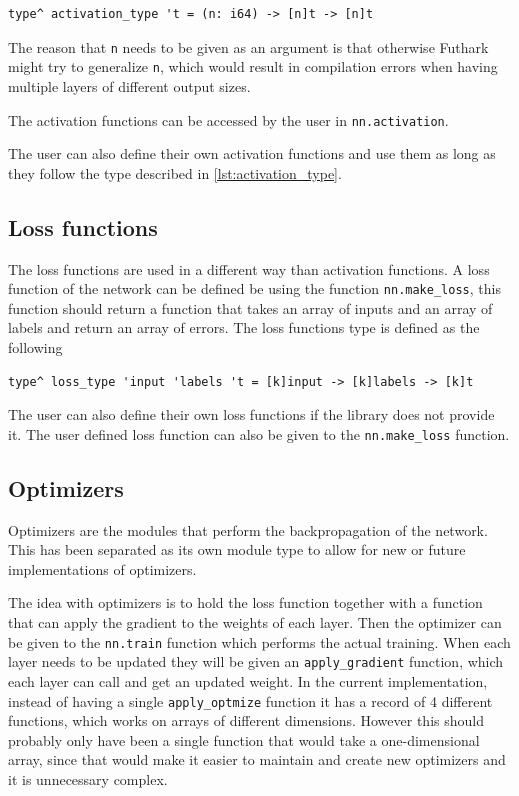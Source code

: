 \begin{lstlisting}[caption=The type definition of activation functions., label={lst:activation_type}]
type^ activation_type 't = (n: i64) -> [n]t -> [n]t
\end{lstlisting}

The reason that \texttt{n} needs to be given as an argument is that otherwise Futhark might try to generalize \texttt{n}, which would result in compilation errors when having multiple layers of different output sizes.

The activation functions can be accessed by the user in \texttt{nn.activation}.

The user can also define their own activation functions and use them as long as they follow the type described in \autoref{lst:activation_type}.

\subsection{Loss functions}

The loss functions are used in a different way than activation functions. A loss function of the network can be defined be using the function \texttt{nn.make\_loss}, this function should return a function that takes an array of inputs and an array of labels and return an array of errors. The loss functions type is defined as the following

\begin{lstlisting}
type^ loss_type 'input 'labels 't = [k]input -> [k]labels -> [k]t
\end{lstlisting}

The user can also define their own loss functions if the library does not provide it. The user defined loss function can also be given to the \texttt{nn.make\_loss} function.

\subsection{Optimizers}

Optimizers are the modules that perform the backpropagation of the network.
This has been separated as its own module type to allow for new or future implementations of optimizers.

The idea with optimizers is to hold the loss function together with a function that can apply the gradient to the weights of each layer.
Then the optimizer can be given to the \texttt{nn.train} function which performs the actual training. When each layer needs to be updated they will be given an \texttt{apply\_gradient} function, which each layer can call and get an updated weight.
In the current implementation, instead of having a single \texttt{apply\_optmize} function it has a record of 4 different functions, which works on arrays of different dimensions. However this should probably only have been a single function that would take a one-dimensional array, since that would make it easier to maintain and create new optimizers and it is unnecessary complex.

